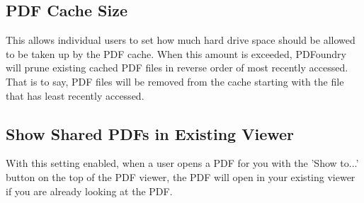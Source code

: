 \documentclass{article}
\begin{document}
    \begin{description}

        \item \subsection{PDF Cache Size} This allows individual users to set how much hard drive space should be allowed to be taken up by the PDF cache. When this amount is exceeded, PDFoundry will prune existing cached PDF files in reverse order of most recently accessed. That is to say, PDF files will be removed from the cache starting with the file that has least recently accessed.

        \item \subsection{Show Shared PDFs in Existing Viewer} With this setting enabled, when a user opens a PDF for you with the 'Show to...' button on the top of the PDF viewer, the PDF will open in your existing viewer if you are already looking at the PDF.

    \end{description}
\end{document}

